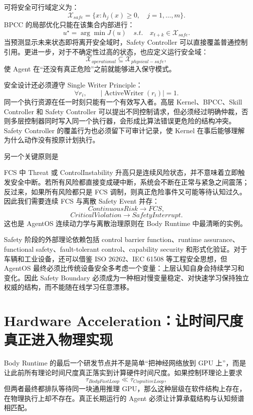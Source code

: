 可将安全可行域定义为：
\[
\mathcal X_{safe}
=
\{
x:
h_j(x)\geq0,\quad j=1,\ldots,m
\}.
\]
BPCC 的局部优化只能在该集合内部进行：
\[
u^\star
=
\arg\min J(u)
\quad
s.t.
\quad
x_{t+k}\in\mathcal X_{safe}.
\]
当预测显示未来状态即将离开安全域时，Safety Controller 可以直接覆盖普通控制引用。更进一步，对于不确定性过高的状态，也应定义运行安全域：
\[
\mathcal X_{operational}
\subseteq
\mathcal X_{physical-safe},
\]
使 Agent 在“还没有真正危险”之前就能够进入保守模式。

安全设计还必须遵守 Single Writer Principle：
\[
\forall r_i,\qquad
|\operatorname{ActiveWriter}(r_i)|=1.
\]
同一个执行资源在任一时刻只能有一个有效写入者。高层 Kernel、BPCC、Skill Controller 和 Safety Controller 可以提出不同控制请求，但必须经过明确仲裁，否则多层控制器同时写入同一个执行器，会形成比算法错误更危险的结构冲突。Safety Controller 的覆盖行为也必须留下可审计记录，使 Kernel 在事后能够理解为什么动作没有按原计划执行。

另一个关键原则是
\begin{statementbox}
\centering
{}
\end{statementbox}
FCS 中 Threat 或 ControlInstability 升高只是连续风险状态，并不意味着立即触发安全中断。若所有风险都直接变成硬中断，系统会不断在正常与紧急之间震荡；反过来，如果所有风险都只是 FCS 调制，则真正危险事件又可能等待认知过久。因此我们需要连续 FCS 与离散 Safety Event 并存：
\[
ContinuousRisk
\rightarrow
FCS,
\]
\[
CriticalViolation
\rightarrow
SafetyInterrupt.
\]
这也是 AgentOS 连续动力学与离散治理原则在 Body Runtime 中最清晰的实例。

Safety 阶段的外部理论依赖包括 control barrier function、runtime assurance、functional safety、fault-tolerant control、capability security 和形式化验证。对于车辆和工业设备，还可以借鉴 ISO 26262、IEC 61508 等工程安全思想，但 AgentOS 最终必须比传统设备安全多考虑一个变量：上层认知自身会持续学习和变化。因此 Safety Boundary 必须成为一种相对慢变量稳定、对快速学习保持独立权威的结构，而不能随在线学习任意漂移。

\section{Hardware Acceleration：让时间尺度真正进入物理实现}

Body Runtime 的最后一个研发节点并不是简单“把神经网络放到 GPU 上”，而是让此前所有理论时间尺度真正落实到计算硬件时间尺度。如果控制环理论上要求
\[
\tau_{BodyFastLoop}\ll\tau_{CognitiveLoop},
\]
但两者最终都排队等待同一块通用推理 GPU，那么这种层级在软件结构上存在，在物理执行上却不存在。真正长期运行的 Agent 必须让计算承载结构与认知频谱相匹配。

